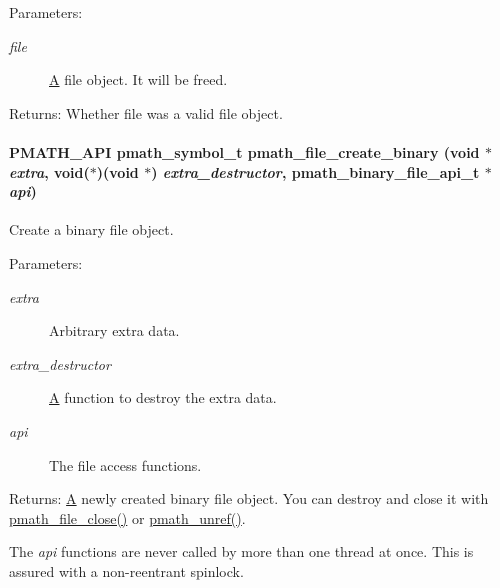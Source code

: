 \begin{Desc}
\item[Parameters:]
\begin{description}
\item[{\em file}]\hyperlink{class_a}{A} file object. It will be freed. \end{description}
\end{Desc}
\begin{Desc}
\item[Returns:]Whether file was a valid file object. \end{Desc}
\hypertarget{group__file__api_g121e1c31d32fa30b60c8bb4d0808f4eb}{
\paragraph[{pmath\_\-file\_\-create\_\-binary}]{\setlength{\rightskip}{0pt plus 5cm}PMATH\_\-API {\bf pmath\_\-symbol\_\-t} pmath\_\-file\_\-create\_\-binary (void $\ast$ {\em extra}, \/  void($\ast$)(void $\ast$) {\em extra\_\-destructor}, \/  {\bf pmath\_\-binary\_\-file\_\-api\_\-t} $\ast$ {\em api})}\hfill}
\label{group__file__api_g121e1c31d32fa30b60c8bb4d0808f4eb}


Create a binary file object. 

\begin{Desc}
\item[Parameters:]
\begin{description}
\item[{\em extra}]Arbitrary extra data. \item[{\em extra\_\-destructor}]\hyperlink{class_a}{A} function to destroy the extra data. \item[{\em api}]The file access functions. \end{description}
\end{Desc}
\begin{Desc}
\item[Returns:]\hyperlink{class_a}{A} newly created binary file object. You can destroy and close it with \hyperlink{group__file__api_g61142920bd7a8f066af908092c84d8e4}{pmath\_\-file\_\-close()} or \hyperlink{classpmath__t_54e905402c38940687033b87eb8c6c9f}{pmath\_\-unref()}.\end{Desc}
The {\em api\/} functions are never called by more than one thread at once. This is assured with a non-reentrant spinlock.

